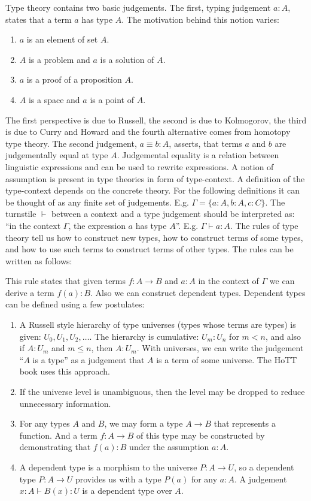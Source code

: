 Type theory contains two basic judgements. The first, typing judgement $a : A$, states that a term $a$ has type $A$. The motivation behind this notion varies:
\begin{enumerate}
	\item $a$ is an element of set $A$.
	\item $A$ is a problem and $a$ is a solution of $A$.
	\item $a$ is a proof of a proposition $A$.
	\item $A$ is a space and $a$ is a point of $A$.
\end{enumerate}
The first perspective is due to Russell, the second is due to Kolmogorov, the third is due to Curry and Howard and the fourth alternative comes from homotopy type theory\autocite{Warren1}. 
The second judgement, $a \equiv b : A$, asserts, that terms $a$ and $b$ are judgementally equal at type $A$. Judgemental equality is a relation between linguistic expressions and can be used to rewrite expressions\autocite{hottbook}. A notion of assumption is present in type theories in form of type-context.
A definition of the type-context depends on the concrete theory. For the following definitions it can be thought of as any finite set of judgements. E.g. $\Gamma = \{a : A, b : A, c : C\}$. The turnstile $\vdash$ between a context and a type judgement should be interpreted as: ``in the context $\Gamma$, the expression $a$ has type $A$''. E.g. $\Gamma \vdash a : A$. The rules of type theory tell us how to construct new types, how to construct terms of some types, and how to use such terms to construct terms of other types. The rules can be written as follows:
\begin{prooftree}
\end{prooftree}
This rule states that given terms $f : A \to B$ and $a : A$ in the context of $\Gamma$ we can derive a term $f(a) : B$.
Also we can construct dependent types. Dependent types can be defined using a few postulates\autocite{Wellen1}:
\begin{enumerate}
  \item A Russell style hierarchy of type universes (types whose terms are types) is given: $U_0, U_1, U_2, \dots$. The hierarchy is cumulative: $U_m : U_n$ for $m < n$, and also if $A : U_m$ and $m \leq n$, then $A : U_m$. With universes, we can write the judgement ``$A$ is a type'' as a judgement that $A$ is a term of some universe. The HoTT book uses this approach.  
  \item If the universe level is unambiguous, then the level may be dropped to reduce unnecessary information.
  \item For any types $A$ and $B$, we may form a type $A \to B$ that represents a function. And a term $f : A \to B$ of this type may be constructed by demonstrating that $f(a) : B$ under the assumption $a : A$.
  \item A dependent type is a morphism to the universe $P : A \to U$, so a dependent type $P : A \to U$ provides us with a type $P(a)$ for any $a : A$. A judgement $x : A \vdash B(x) : U$ is a dependent type over $A$.
\end{enumerate}

